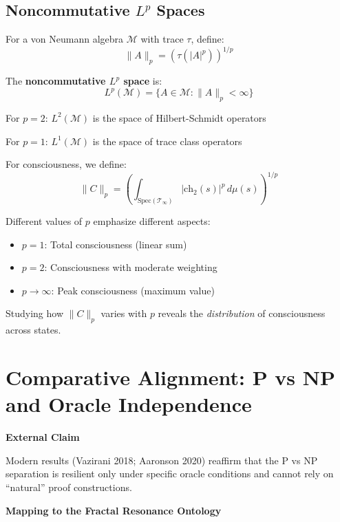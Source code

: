\begin{advanced}
\subsection{Noncommutative \texorpdfstring{$L^p$}{L\^{}p} Spaces}

For a von Neumann algebra $\mathcal{M}$ with trace $\tau$, define:
\begin{equation}
\| A \|_p = \left( \tau(|A|^p) \right)^{1/p}
\end{equation}

The \textbf{noncommutative $L^p$ space} is:
\begin{equation}
L^p(\mathcal{M}) = \{ A \in \mathcal{M} : \| A \|_p < \infty \}
\end{equation}

For $p=2$: $L^2(\mathcal{M})$ is the space of Hilbert-Schmidt operators

For $p=1$: $L^1(\mathcal{M})$ is the space of trace class operators

For consciousness, we define:
\begin{equation}
\| C \|_p = \left( \int_{\text{Spec}(\mathcal{T}_\infty)} |\text{ch}_2(s)|^p \, d\mu(s) \right)^{1/p}
\end{equation}

Different values of $p$ emphasize different aspects:
\begin{itemize}
\item $p=1$: Total consciousness (linear sum)
\item $p=2$: Consciousness with moderate weighting
\item $p \to \infty$: Peak consciousness (maximum value)
\end{itemize}

Studying how $\| C \|_p$ varies with $p$ reveals the \textit{distribution} of consciousness across states.
\end{advanced}

\section{Comparative Alignment: P vs NP and Oracle Independence}

\textbf{External Claim}

Modern results (Vazirani 2018; Aaronson 2020) reaffirm that the P vs NP separation is resilient only under specific oracle conditions and cannot rely on ``natural'' proof constructions.

\textbf{Mapping to the Fractal Resonance Ontology}

